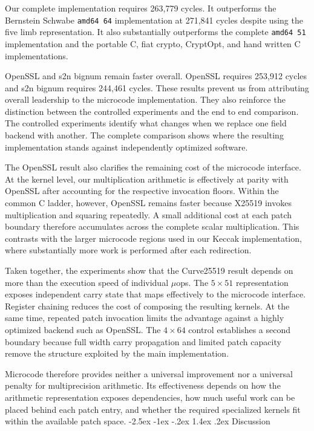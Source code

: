 \documentclass[journal=tches,submission]{iacrtrans}
\makeatletter
\renewcommand\section{\@startsection{section}{1}{\z@}%
      {-2.5ex \@plus -1ex \@minus -.2ex}%
      {1.4ex \@plus .2ex}%
      {\normalfont\Large\bfseries\SS@sectfont}}
\makeatother
\begin{document}
Our complete implementation requires 263,779 cycles.
It outperforms the Bernstein Schwabe \texttt{amd64 64} implementation at 271,841 cycles despite using the five limb representation.
It also substantially outperforms the complete \texttt{amd64 51} implementation and the portable C, fiat crypto, CryptOpt, and hand written C implementations.

OpenSSL and s2n bignum remain faster overall.
OpenSSL requires 253,912 cycles and s2n bignum requires 244,461 cycles.
These results prevent us from attributing overall leadership to the microcode implementation.
They also reinforce the distinction between the controlled experiments and the end to end comparison.
The controlled experiments identify what changes when we replace one field backend with another.
The complete comparison shows where the resulting implementation stands against independently optimized software.

The OpenSSL result also clarifies the remaining cost of the microcode interface.
At the kernel level, our multiplication arithmetic is effectively at parity with OpenSSL after accounting for the respective invocation floors.
Within the common C ladder, however, OpenSSL remains faster because X25519 invokes multiplication and squaring repeatedly.
A small additional cost at each patch boundary therefore accumulates across the complete scalar multiplication.
This contrasts with the larger microcode regions used in our Keccak implementation, where substantially more work is performed after each redirection.

Taken together, the experiments show that the Curve25519 result depends on more than the execution speed of individual $\mu$ops.
The $5\times51$ representation exposes independent carry state that maps effectively to the microcode interface.
Register chaining reduces the cost of composing the resulting kernels.
At the same time, repeated patch invocation limits the advantage against a highly optimized backend such as OpenSSL.
The $4\times64$ control establishes a second boundary because full width carry propagation and limited patch capacity remove the structure exploited by the main implementation.

Microcode therefore provides neither a universal improvement nor a universal penalty for multiprecision arithmetic.
Its effectiveness depends on how the arithmetic representation exposes dependencies, how much useful work can be placed behind each patch entry, and whether the required specialized kernels fit within the available patch space.
\section{Discussion}
\end{document}
